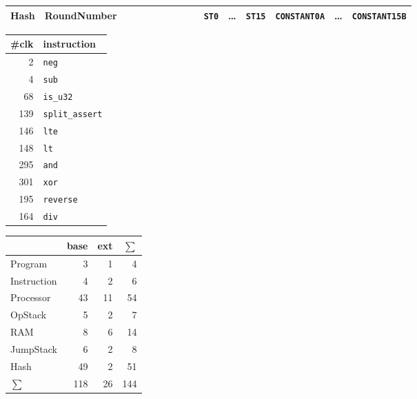 \documentclass{article}
\begin{document}
{\begin{tabular}{lllllllllllllllllllllll}
    Hash        & \multicolumn{4}{l}{RoundNumber}                             &             &                   &              &                     &              &              &              &              & \texttt{ST0} & \dots & \texttt{ST15} & \multicolumn{3}{r}{\texttt{CONSTANT0A}}    & \dots & \multicolumn{3}{l}{\texttt{CONSTANT15B}}          \\ \bottomrule
\end{tabular}
} %
\vfill%
\begin{minipage}[t][0.6\textheight][s]{0.3\textwidth}
    \vfill
    \begin{tabular}{rl}
        \toprule
        \#clk & instruction            \\ \midrule
            2 & \texttt{neg}           \\
            4 & \texttt{sub}           \\
           68 & \texttt{is\_u32}       \\
          139 & \texttt{split\_assert} \\
          146 & \texttt{lte}           \\
          148 & \texttt{lt}            \\
          295 & \texttt{and}           \\
          301 & \texttt{xor}           \\
          195 & \texttt{reverse}       \\
          164 & \texttt{div}           \\ \bottomrule
    \end{tabular}

    \vfill
    \begin{tabular}{lrrr}
        \toprule
                    & base & ext & $\sum$ \\ \midrule
        Program     &    3 &   1 &      4 \\
        Instruction &    4 &   2 &      6 \\
        Processor   &   43 &  11 &     54 \\
        OpStack     &    5 &   2 &      7 \\
        RAM         &    8 &   6 &     14 \\
        JumpStack   &    6 &   2 &      8 \\
        Hash        &   49 &   2 &     51 \\ \bottomrule\bottomrule
        $\sum$      &  118 &  26 &    144
    \end{tabular}
\end{minipage}%
\end{document}
